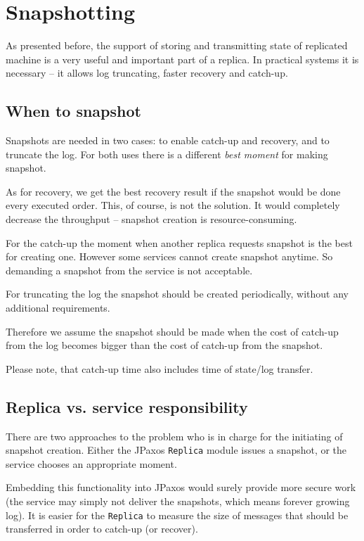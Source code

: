 \section{Snapshotting}
\label{sec:snapshotting}
As presented before, the support of storing and transmitting state of replicated machine is a very useful and important part of a replica. In practical systems it is necessary -- it allows log truncating, faster recovery and catch-up.

\subsection{When to snapshot}
\label{subsec:when_to_snapshot}
Snapshots are needed in two cases: to enable catch-up and recovery, and to truncate the log. For both uses there is a different \textit{best moment} for making snapshot.

As for recovery, we get the best recovery result if the snapshot would be done every executed order.
This, of course, is not the solution. It would completely decrease the throughput -- snapshot creation is resource-consuming.

For the catch-up the moment when another replica requests snapshot is the best for creating one. 
However some services cannot create snapshot anytime. So demanding a snapshot from the service is not acceptable.

For truncating the log the snapshot should be created periodically, without any additional requirements.

Therefore we assume the snapshot should be made when the cost of catch-up from the log becomes bigger than the cost of catch-up from the snapshot.

Please note, that catch-up time also includes time of state/log transfer.

\subsection{Replica vs. service responsibility}
\label{subsec:replica_vs_state_machine_responsibility}
There are two approaches to the problem who is in charge for the initiating of snapshot creation. Either the JPaxos \texttt{Replica} module issues a snapshot, or the service chooses an appropriate moment.

Embedding this functionality into JPaxos would surely provide more secure work (the service may simply not deliver the snapshots, which means forever growing log). It is easier for the \texttt{Replica} to measure the size of messages that should be transferred in order to catch-up (or recover).

